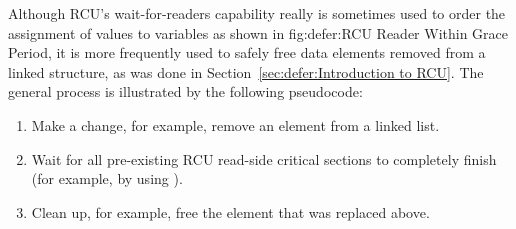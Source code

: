 Although RCU's wait-for-readers capability really is sometimes used to
order the assignment of values to variables as shown in
{fig:defer:RCU Reader Within Grace Period},
it is more frequently used to safely free data elements removed from
a linked structure, as was done in
Section~\ref{sec:defer:Introduction to RCU}.
The general process is illustrated by the following pseudocode:

\begin{enumerate}
\item	Make a change, for example, remove an element from a linked list.
\item	Wait for all pre-existing RCU read-side critical sections to
	completely finish (for example, by using
	).
\item	Clean up, for example, free the element that was replaced above.
\end{enumerate}

